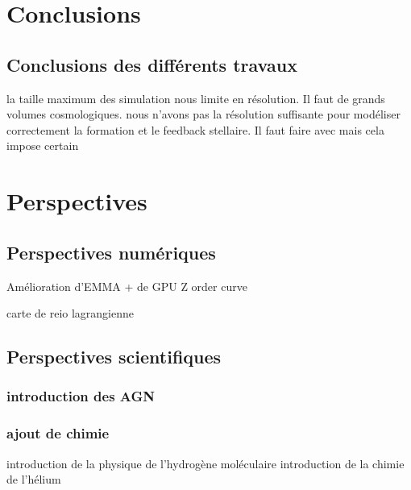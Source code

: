\chapter{Conclusions}

\section{Conclusions des différents travaux}


la taille maximum des simulation nous limite en résolution.
Il faut de grands volumes cosmologiques.
nous n'avons pas la résolution suffisante pour modéliser correctement la formation et le feedback stellaire.
Il faut faire avec mais cela impose certain 





\chapter{Perspectives}

\section{Perspectives numériques}

Amélioration d'EMMA
+ de GPU
Z order curve


carte de reio lagrangienne

\section{Perspectives scientifiques}

\subsection{introduction des AGN}

\subsection{ajout de chimie}
introduction de la physique de l'hydrogène moléculaire
introduction de la chimie de l'hélium

